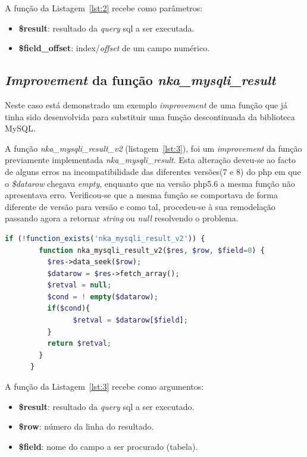 A função da Listagem~\ref{lst:2} recebe como parâmetros:
\begin{itemize}
  \item \textbf{\$result}: resultado da \textit{query} \acrshort{sql} a ser executada.
  \item \textbf{\$field\_offset}: index/\textit{offset} de um campo numérico.
\end{itemize}


\subsection{\textit{Improvement} da função \textit{nka\_mysqli\_result}}

Neste caso está demonstrado um exemplo \textit{improvement} de uma função que já tinha sido desenvolvida para substituir uma função descontinuada da biblioteca MySQL.

A função \textit{nka\_mysqli\_result\_v2} (listagem~\ref{lst:3}), foi um \textit{improvement} da função previamente implementada \textit{nka\_mysqli\_result}. Esta alteração deveu-se ao facto de alguns erros na incompatibilidade das diferentes versões(7 e 8) do \acrshort{php} em que o \textit{\$datarow} chegava \textit{empty}, enquanto que na versão \acrshort{php}5.6 a mesma função não apresentava erro. Verificou-se que a mesma função se comportava de forma diferente de versão para versão e como tal, procedeu-se à sua remodelação passando agora a retornar \textit{string} ou \textit{null} resolvendo o problema.


\begin{lstlisting}[language={php},
                   caption={Improvement da função nka\_mysql\_result.},
                   label=lst:3]
      if (!function_exists('nka_mysqli_result_v2')) {
        function nka_mysqli_result_v2($res, $row, $field=0) {
      	  $res->data_seek($row);
      	  $datarow = $res->fetch_array();
      	  $retval = null;
      	  $cond = ! empty($datarow);
      	  if($cond){
      		    $retval = $datarow[$field];
      	  }
      	  return $retval;
      	}
      }
\end{lstlisting}

A função da Listagem~\ref{lst:3} recebe como argumentos:
\begin{itemize}
  \item \textbf{\$result}: resultado da \textit{query} \acrshort{sql} a ser executado.
  \item \textbf{\$row}: número da linha do resultado.
  \item \textbf{\$field}: nome do campo a ser procurado (tabela).
\end{itemize}



